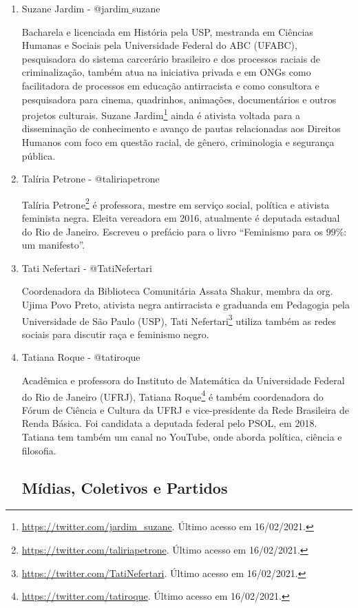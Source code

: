 \documentclass[
	12pt,				%
	openright,			%
	twoside,			%
	a4paper,			%
	english,			%
	brazil				%
	]{abntex2}
\begin{document}
\begin{anexosenv}
\begin{enumerate}
 \item Suzane Jardim - @jardim$\_$suzane
 
 Bacharela e licenciada em História pela USP, mestranda em Ciências Humanas e Sociais pela Universidade Federal do ABC (UFABC), pesquisadora do sistema carcerário brasileiro e dos processos raciais de criminalização, também atua na iniciativa privada e em ONGs como facilitadora de processos em educação antirracista e como consultora e pesquisadora para cinema, quadrinhos, animações, documentários e outros projetos culturais. Suzane Jardim\footnote{\url{https://twitter.com/jardim_suzane}. Último acesso em 16/02/2021.} ainda é ativista voltada para a disseminação de conhecimento e avanço de pautas relacionadas aos Direitos Humanos com foco em questão racial, de gênero, criminologia e segurança pública.

 \item Talíria Petrone - @taliriapetrone
 
 Talíria Petrone\footnote{\url{https://twitter.com/taliriapetrone}. Último acesso em 16/02/2021.} é professora, mestre em serviço social, política e ativista feminista negra. Eleita vereadora em 2016, atualmente é deputada estadual do Rio de Janeiro. Escreveu o prefácio para o livro ``Feminismo para os $99\%$: um manifesto''.

 \item Tati Nefertari - @TatiNefertari
 
 Coordenadora da Biblioteca Comunitária Assata Shakur, membra da org. Ujima Povo Preto, ativista negra antirracista e graduanda em Pedagogia pela Universidade de São Paulo (USP), Tati Nefertari\footnote{\url{https://twitter.com/TatiNefertari}. Último acesso em 16/02/2021.} utiliza também as redes sociais para discutir raça e feminismo negro.

 \item Tatiana Roque - @tatiroque
 
 Acadêmica e professora do Instituto de Matemática da Universidade Federal do Rio de Janeiro (UFRJ), Tatiana Roque\footnote{\url{https://twitter.com/tatiroque}. Último acesso em 16/02/2021.} é também coordenadora do Fórum de Ciência e Cultura da UFRJ e vice-presidente da Rede Brasileira de Renda Básica. Foi candidata a deputada federal pelo PSOL, em 2018. Tatiana tem também um canal no YouTube, onde aborda política, ciência e filosofia.

 \subsection*{Mídias, Coletivos e Partidos}


\end{enumerate}
\end{anexosenv}
\end{document}
